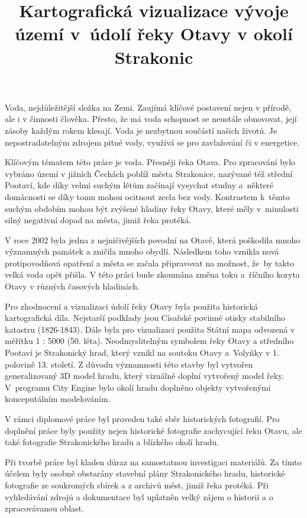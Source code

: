 \documentclass[thesis=M,czech]{FITthesis}[2012/06/26]
\title{Kartografická vizualizace vývoje území v~údolí řeky Otavy v okolí Strakonic}
\begin{document}

\begin{introduction}
Voda, nejdůležitější složka na Zemi. Zaujímá klíčové postavení nejen v přírodě, ale i v činnosti člověka. Přesto, že má voda schopnost se neustále obnovovat, její zásoby každým rokem klesají. Voda je nezbytnou součástí našich životů. Je nepostradatelným zdrojem pitné vody, využívá se pro zavlažování či v energetice. 

Klíčovým tématem této práce je voda. Přesněji řeka Otava. Pro zpracování bylo vybráno území v jižních Čechách poblíž města Strakonice, nazývané též střední Pootaví, kde díky velmi suchým létům začínají vysychat studny a~některé domácnosti se díky tomu mohou ocitnout zcela bez vody. Kontrastem k~těmto suchým obdobím mohou být zvýšené hladiny řeky Otavy, které měly v~minulosti silný negativní dopad na města, jimiž řeka protéká.

V roce 2002 byla jedna z nejničivějších povodní na Otavě, která poškodila mnoho významných památek a zničila mnoho obydlí. Následkem toho vznikla nová protipovodňová opatření a města se začala připravovat na možnost, že~by takto velká voda opět přišla. V této práci bude zkoumána změna toku a~říčního koryta Otavy v různých časových hladinách.

Pro zhodnocení a vizualizaci údolí řeky Otavy byla použita historická kartografická díla. Nejstarší podklady jsou Císařské povinné otisky stabilního katastru (1826-1843). Dále byla pro vizualizaci použita Státní mapa odvozená v měřítku 1 : 5000 (50. léta). Neodmyslitelným symbolem řeky Otavy a středního Pootaví je Strakonický hrad, který vznikl na soutoku Otavy a~Volyňky v 1. polovině 13. století. Z důvodu významnosti této stavby byl vytvořen generalizovaný 3D model hradu, který vizuálně doplní vytvořený model řeky. V~programu City Engine bylo okolí hradu doplněno objekty vytvořenými konceputálním modelováním.

V rámci diplomové práce byl proveden také sběr historických fotografií. Pro doplnění práce byly použity nejen historické fotografie zachycující řeku Otavu, ale také fotografie Strakonického hradu a blízkého okolí hradu. 

Při tvorbě práce byl kladen důraz na samostatnou investigaci materiálů. Za tímto účelem byly osobně obstarány stavební plány Strakonického hradu, historické fotografie ze soukromých sbírek a z archivů měst, jimiž řeka protéká. Při vyhledávání zdrojů a dokumentace byl uplatněn velký zájem o historii a o zpracovávanou oblast. 


\end{introduction}
\end{document}
